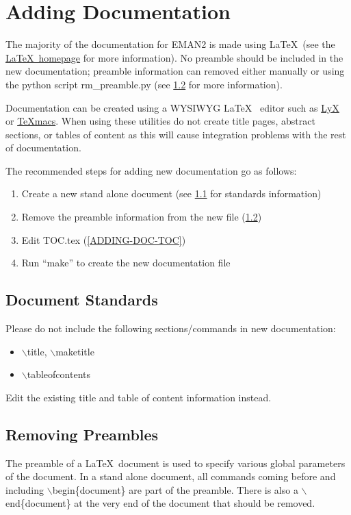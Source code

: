 \section{Adding Documentation}

The majority of the documentation for EMAN2 is made using \LaTeX ~(see the
\href{http://www.latex-project.org/}{\LaTeX ~homepage} for more
information).  No preamble should be included in the new
documentation; preamble information can removed either manually or
using the python script rm\_preamble.py (see \ref{ADDING-DOC-RMPRE}
for more information).  

Documentation can be created using a WYSIWYG \LaTeX ~ editor such as
\href{http://www.lyx.org/}{LyX} or
\href{http://www.www.texmacs.org/}{TeXmacs}.  When using these
utilities do not create title pages, abstract sections, or tables of
content as this will cause integration problems with the rest of
documentation.

The recommended steps for adding new documentation go as follows:
\begin{enumerate}
  \item Create a new stand alone document (see \ref{ADDING-DOC-STANDS}
  for standards information)
  \item Remove the preamble information from the new file
  (\ref{ADDING-DOC-RMPRE})
  \item Edit TOC.tex (\ref{ADDING-DOC-TOC})
  \item Run ``make'' to create the new documentation file
\end{enumerate}

\subsection{Document Standards} \label{ADDING-DOC-STANDS}
Please do not include the following sections/commands in new documentation:
\begin{itemize}
  \item
    $\backslash$title, $\backslash$maketitle
  \item
    $\backslash$tableofcontents
\end{itemize}
Edit the existing title and table of content information instead.


\subsection{Removing Preambles} \label{ADDING-DOC-RMPRE}

The preamble of a \LaTeX ~document is used to specify various global
parameters of the document.  In a stand alone document, all commands
coming before and including $\backslash$begin\{document\} are part of the
preamble.  There is also a $\backslash$end\{document\} at the very end
of the document that should be removed.

